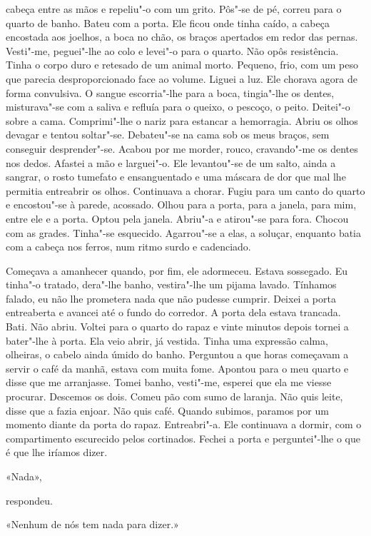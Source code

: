 cabeça entre as mãos e repeliu"-o com um grito. Pôs"-se de pé, correu
para o quarto de banho. Bateu com a porta. Ele ficou onde tinha caído, a
cabeça encostada aos joelhos, a boca no chão, os braços apertados em
redor das pernas. Vesti"-me, peguei"-lhe ao colo e levei"-o para o
quarto. Não opôs resistência. Tinha o corpo duro e retesado de um animal
morto. Pequeno, frio, com um peso que parecia desproporcionado face ao
volume. Liguei a luz. Ele chorava agora de forma convulsiva. O sangue
escorria"-lhe para a boca, tingia"-lhe os dentes, misturava"-se com a
saliva e refluía para o queixo, o pescoço, o peito. Deitei"-o sobre a
cama. Comprimi"-lhe o nariz para estancar a hemorragia. Abriu os olhos
devagar e tentou soltar"-se. Debateu"-se na cama sob os meus braços, sem
conseguir desprender"-se. Acabou por me morder, rouco, cravando"-me os
dentes nos dedos. Afastei a mão e larguei"-o. Ele levantou"-se de um
salto, ainda a sangrar, o rosto tumefato e ensanguentado e uma máscara
de dor que mal lhe permitia entreabrir os olhos. Continuava a chorar.
Fugiu para um canto do quarto e encostou"-se à parede, acossado. Olhou
para a porta, para a janela, para mim, entre ele e a porta. Optou pela
janela. Abriu"-a e atirou"-se para fora. Chocou com as grades. Tinha"-se
esquecido. Agarrou"-se a elas, a soluçar, enquanto batia com a cabeça
nos ferros, num ritmo surdo e cadenciado.

Começava a amanhecer quando, por fim, ele adormeceu. Estava sossegado.
Eu tinha"-o tratado, dera"-lhe banho, vestira"-lhe um pijama lavado.
Tínhamos falado, eu não lhe prometera nada que não pudesse cumprir.
Deixei a porta entreaberta e avancei até o fundo do corredor. A porta
dela estava trancada. Bati. Não abriu. Voltei para o quarto do rapaz e
vinte minutos depois tornei a bater"-lhe à porta. Ela veio abrir, já
vestida. Tinha uma expressão calma, olheiras, o cabelo ainda úmido do
banho. Perguntou a que horas começavam a servir o café da manhã,
estava com muita fome. Apontou para o meu quarto e disse que me
arranjasse. Tomei banho, vesti"-me, esperei que ela me viesse procurar.
Descemos os dois. Comeu pão com sumo de laranja. Não quis leite, disse
que a fazia enjoar. Não quis café. Quando subimos, paramos por um
momento diante da porta do rapaz. Entreabri"-a. Ele continuava a dormir,
com o compartimento escurecido pelos cortinados. Fechei a porta e
perguntei"-lhe o que é que lhe iríamos dizer.

«Nada»,

respondeu.

«Nenhum de nós tem nada para dizer.»

